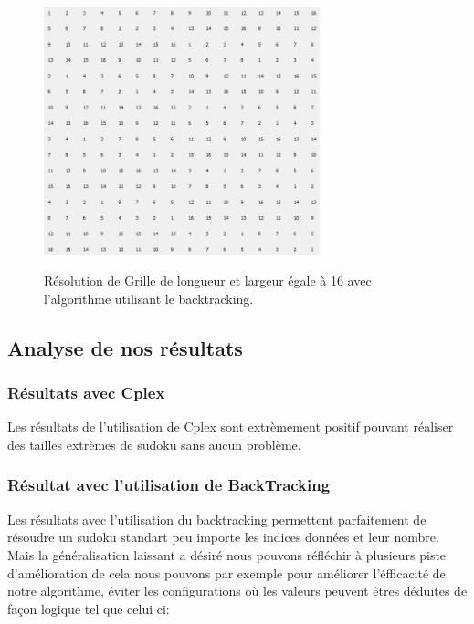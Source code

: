 \begin{figure}[h]
  \begin{center}
\includegraphics[width=8cm]{./images/Resultat_16_Back.png}\label{Test_Back_16_16}
\caption{Résolution de Grille de longueur et largeur égale à 16 avec l'algorithme utilisant le backtracking.}
\end{center}
\end{figure}

\subsection{Analyse de nos résultats}

\subsubsection{Résultats avec Cplex}

Les résultats de l'utilisation de Cplex sont extrèmement positif pouvant réaliser des tailles extrèmes de sudoku sans aucun problème.

\subsubsection{Résultat avec l'utilisation de BackTracking}

Les résultats avec l'utilisation du backtracking permettent parfaitement de résoudre un sudoku standart peu importe les indices données et leur nombre. Mais la généralisation laissant a désiré nous pouvons réfléchir à plusieurs piste d'amélioration de cela nous pouvons par exemple pour améliorer l'éfficacité de notre algorithme, éviter les configurations où les valeurs peuvent êtres déduites de façon logique tel que celui ci:


